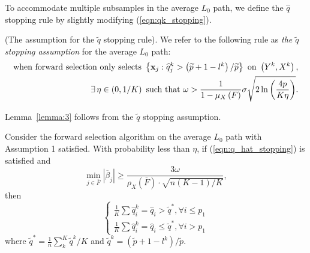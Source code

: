 \documentclass[11pt,review,authoryear]{elsarticle}
\begin{document}
\begin{appendices}
To accommodate multiple subsamples in the average $L_0$ path, we define the $\widehat{q}$ stopping rule by slightly modifying (\ref{eqn:qk_stopping}).
%
\begin{definition}
  (The assumption for the $\widetilde{q}$ stopping rule). We refer to the following rule as \emph{the $\widetilde{q}$ stopping assumption} for the average $L_0$ path:
  \begin{eqnarray}
    \mbox{when forward selection only selects } \left\{ \mathbf{x}_j:\widehat{q}_j^k > \left( \widetilde{p} + 1 - l^k \right) / \widetilde{p} \right\} \mbox{ on } \left(Y^k, X^k \right), \notag \\
    \exists\, \eta \in \left( 0, 1/K\right) \mbox{ such that } \omega >\frac{1}{1-\mu_{X}\left(F\right)}\sigma\sqrt{2\ln\left( \frac{4p}{K\eta}\right)}.
    \label{eqn:q_hat_stopping}
  \end{eqnarray}
\end{definition}
\medskip

Lemma~\ref{lemma:3} follows from the $\widetilde{q}$ stopping assumption.

\begin{lemma}
  Consider the forward selection algorithm on the average $L_{0}$ path with Assumption 1 satisfied. With probability less than $\eta$, if (\ref{eqn:q_hat_stopping}) is satisfied and
  \[
      \min_{j\in\overline{F}}\left|\overline{\beta}_{j}\right|\geqslant\frac{3\omega}{\rho_{X}\left(\overline{F}\right)\cdot\sqrt{n\left(K-1\right)/K}},
  \]
  then
  \[
  \begin{cases}
      \frac{1}{K}\sum\widehat{q}_{i}^{k}=\widehat{q}_{i}>\widetilde{q}^{*},\forall i\leqslant p_{1}\\
      \frac{1}{K}\sum\widehat{q}_{i}^{k}=\widehat{q}_{i}\leqslant\widetilde{q}^{*},\forall i>p_{1}
  \end{cases}
  \]
  where $\widetilde{q}^* = \frac{1}{n} \sum_k^K \widetilde{q}^k / K$ and $\widetilde{q}^k = \left(\widetilde{p} + 1 - l^k\right) / \widetilde{p}$.
  \label{lemma:3}
\end{lemma}


\end{appendices}
\end{document}
